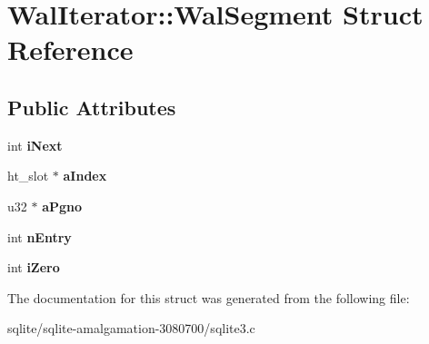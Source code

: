 \hypertarget{struct_wal_iterator_1_1_wal_segment}{\section{Wal\+Iterator\+:\+:Wal\+Segment Struct Reference}
\label{struct_wal_iterator_1_1_wal_segment}
}
\subsection*{Public Attributes}
\begin{DoxyCompactItemize}
\item 
\hypertarget{struct_wal_iterator_1_1_wal_segment_a329c939b196f907fe98cf762bb07d291}{int {\bfseries i\+Next}}\label{struct_wal_iterator_1_1_wal_segment_a329c939b196f907fe98cf762bb07d291}

\item 
\hypertarget{struct_wal_iterator_1_1_wal_segment_adec397836a127acafcc551cb1fdcd851}{ht\+\_\+slot $\ast$ {\bfseries a\+Index}}\label{struct_wal_iterator_1_1_wal_segment_adec397836a127acafcc551cb1fdcd851}

\item 
\hypertarget{struct_wal_iterator_1_1_wal_segment_a5e43273a11dc5856934834c0cdf7f198}{u32 $\ast$ {\bfseries a\+Pgno}}\label{struct_wal_iterator_1_1_wal_segment_a5e43273a11dc5856934834c0cdf7f198}

\item 
\hypertarget{struct_wal_iterator_1_1_wal_segment_ad80cf479aa670eda7aa1adee607af7d9}{int {\bfseries n\+Entry}}\label{struct_wal_iterator_1_1_wal_segment_ad80cf479aa670eda7aa1adee607af7d9}

\item 
\hypertarget{struct_wal_iterator_1_1_wal_segment_a3eedec5e8e8dd94be670d50ac144a959}{int {\bfseries i\+Zero}}\label{struct_wal_iterator_1_1_wal_segment_a3eedec5e8e8dd94be670d50ac144a959}

\end{DoxyCompactItemize}


The documentation for this struct was generated from the following file\+:\begin{DoxyCompactItemize}
\item 
sqlite/sqlite-\/amalgamation-\/3080700/sqlite3.\+c\end{DoxyCompactItemize}
